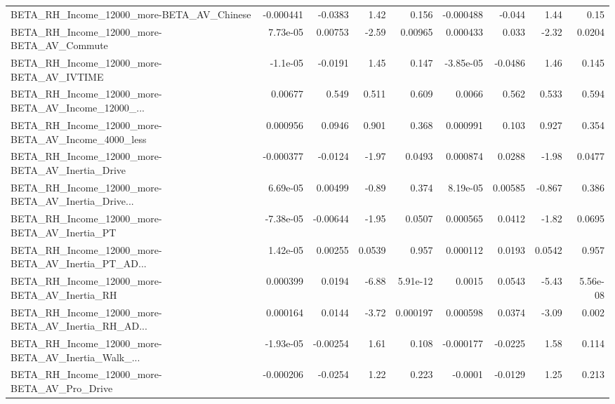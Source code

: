 \begin{tabular}{lrrrrrrrr}
BETA\_RH\_Income\_12000\_more-BETA\_AV\_Chinese          &   -0.000441 &      -0.0383 &     1.42 &    0.156 &  -0.000488 &      -0.044 &         1.44 &          0.15 \\
BETA\_RH\_Income\_12000\_more-BETA\_AV\_Commute          &    7.73e-05 &      0.00753 &    -2.59 &  0.00965 &   0.000433 &       0.033 &        -2.32 &        0.0204 \\
BETA\_RH\_Income\_12000\_more-BETA\_AV\_IVTIME           &    -1.1e-05 &      -0.0191 &     1.45 &    0.147 &  -3.85e-05 &     -0.0486 &         1.46 &         0.145 \\
BETA\_RH\_Income\_12000\_more-BETA\_AV\_Income\_12000\_... &     0.00677 &        0.549 &    0.511 &    0.609 &     0.0066 &       0.562 &        0.533 &         0.594 \\
BETA\_RH\_Income\_12000\_more-BETA\_AV\_Income\_4000\_less &    0.000956 &       0.0946 &    0.901 &    0.368 &   0.000991 &       0.103 &        0.927 &         0.354 \\
BETA\_RH\_Income\_12000\_more-BETA\_AV\_Inertia\_Drive    &   -0.000377 &      -0.0124 &    -1.97 &   0.0493 &   0.000874 &      0.0288 &        -1.98 &        0.0477 \\
BETA\_RH\_Income\_12000\_more-BETA\_AV\_Inertia\_Drive... &    6.69e-05 &      0.00499 &    -0.89 &    0.374 &   8.19e-05 &     0.00585 &       -0.867 &         0.386 \\
BETA\_RH\_Income\_12000\_more-BETA\_AV\_Inertia\_PT       &   -7.38e-05 &     -0.00644 &    -1.95 &   0.0507 &   0.000565 &      0.0412 &        -1.82 &        0.0695 \\
BETA\_RH\_Income\_12000\_more-BETA\_AV\_Inertia\_PT\_AD... &    1.42e-05 &      0.00255 &   0.0539 &    0.957 &   0.000112 &      0.0193 &       0.0542 &         0.957 \\
BETA\_RH\_Income\_12000\_more-BETA\_AV\_Inertia\_RH       &    0.000399 &       0.0194 &    -6.88 & 5.91e-12 &     0.0015 &      0.0543 &        -5.43 &      5.56e-08 \\
BETA\_RH\_Income\_12000\_more-BETA\_AV\_Inertia\_RH\_AD... &    0.000164 &       0.0144 &    -3.72 & 0.000197 &   0.000598 &      0.0374 &        -3.09 &         0.002 \\
BETA\_RH\_Income\_12000\_more-BETA\_AV\_Inertia\_Walk\_... &   -1.93e-05 &     -0.00254 &     1.61 &    0.108 &  -0.000177 &     -0.0225 &         1.58 &         0.114 \\
BETA\_RH\_Income\_12000\_more-BETA\_AV\_Pro\_Drive        &   -0.000206 &      -0.0254 &     1.22 &    0.223 &    -0.0001 &     -0.0129 &         1.25 &         0.213 \\

\end{tabular}
